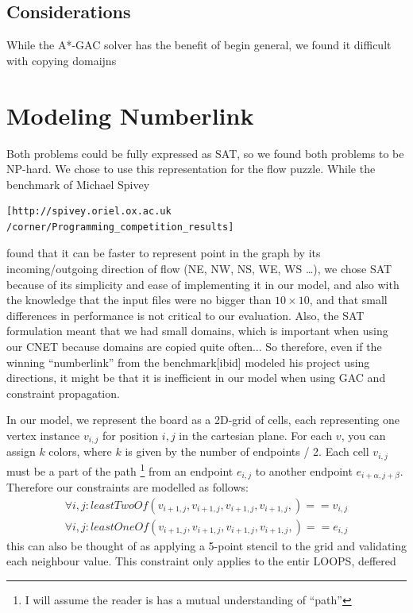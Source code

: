 \documentclass[journal]{IEEEtran}
\begin{document}
\subsection*{Considerations}
While the A*-GAC solver has the benefit of begin general, we found it difficult
with copying domaijns

\section*{Modeling Numberlink}
Both problems could be fully expressed as SAT, so we found both problems to
be NP-hard. We chose to use this representation for the flow puzzle. 
While the benchmark of Michael Spivey 
\small\begin{verbatim}
[http://spivey.oriel.ox.ac.uk
/corner/Programming_competition_results]\end{verbatim}
\normalsize
found that it can be faster to represent point in the graph by its
incoming/outgoing direction of flow (NE, NW, NS, WE, WS \dots), 
we chose SAT because of its simplicity and ease of implementing it in our
model, and also with the knowledge that the input files were no bigger than
$10 \times 10$, and that small differences in performance is not critical to our evaluation.
Also, the SAT formulation meant that we had small domains, which is important
when using our CNET because domains are copied quite often... So therefore, 
even if the winning ``numberlink'' from the benchmark[ibid] modeled 
his project using directions, it might be that it is inefficient in 
our model when using GAC and constraint propagation.

In our model, we represent the board as a 2D-grid of cells, each representing one
vertex instance $v_{i,j}$ for position $i,j$ in the cartesian plane.
For each $v$, you can assign $k$ colors, where $k$ is given by
the number of endpoints / 2. 
Each cell $v_{i,j}$ must be a part of the path
\footnote{I will assume the reader is has a mutual understanding of ``path''}
from an endpoint $e_{i,j}$ to another endpoint $e_{i+\alpha,j+\beta}$.
Therefore our constraints are modelled as follows:
\begin{align}
    \forall{i,j}: leastTwoOf( v_{i+1,j},v_{i+1,j},v_{i+1,j},v_{i+1,j}, ) == v_{i,j} \\   %
    \forall{i,j}: leastOneOf( v_{i+1,j},v_{i+1,j},v_{i+1,j},v_{i+1,j}, ) == e_{i,j}
\end{align}
this can also be thought of as applying a 5-point stencil to the grid
and validating each neighbour value. This constraint only applies to the entir
LOOPS, deffered
\end{document}
